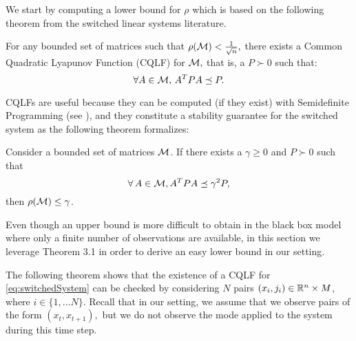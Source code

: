 We start by computing a lower bound for $\rho$ which is based on the following theorem from the switched linear systems literature.
\begin{theorem}\cite[Theorem 2.11]{jungers_lncis}\label{thm:john}
For any bounded set of matrices such that $\rho(\mathcal{M})<\frac{1}{\sqrt{n}},$ there exists a Common Quadratic Lyapunov Function (CQLF) for $\mathcal{M},$ that is, a $P\succ 0$ such that: $$\forall A\in \mathcal{M},\, A^TPA\preceq P. $$
\end{theorem}

CQLFs are useful because they can be computed (if they exist) with Semidefinite Programming (see \cite{boyd}), and they constitute a stability guarantee for the switched system as the following theorem formalizes:
\begin{theorem}\cite[Prop. 2.8]{jungers_lncis}\label{thm:cqlf} Consider a bounded set of matrices $\mathcal{M}$. If there exists a $\gamma \geq 0$ and $P \succ 0$ such that $$\forall\, A \in \mathcal{M}, A^TPA \preceq \gamma^2P,$$ then $\rho(\mathcal{M}) \leq \gamma$. 
\end{theorem}

Even though an upper bound is more difficult to obtain in the black box model where only a finite number of observations are available, in this section we leverage Theorem 3.1 in order to derive an easy lower bound in our setting.

The following theorem shows that the existence of a CQLF for \eqref{eq:switchedSystem} can be checked by considering $N$ pairs $(x_i, j_i) \in \mathbb{R}^n \times M$, where $i \in \{1, \ldots N\}.$ Recall that in our setting, we assume that we observe pairs of the form $(x_t,x_{t+1}),$ but we do not observe the mode applied to the system during this time step.
%

